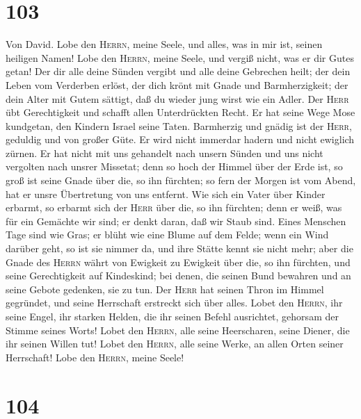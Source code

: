 \hypertarget{section-102}{%
\section{103}\label{section-102}}

 Von David. Lobe den \textsc{Herrn}, meine Seele, und
alles, was in mir ist, seinen heiligen Namen!  Lobe den
\textsc{Herrn}, meine Seele, und vergiß nicht, was er dir Gutes getan!
 Der dir alle deine Sünden vergibt und alle deine
Gebrechen heilt;  der dein Leben vom Verderben erlöst, der
dich krönt mit Gnade und Barmherzigkeit;  der dein Alter
mit Gutem sättigt, daß du wieder jung wirst wie ein Adler.
 Der \textsc{Herr} übt Gerechtigkeit und schafft allen
Unterdrückten Recht.  Er hat seine Wege Mose kundgetan,
den Kindern Israel seine Taten.  Barmherzig und gnädig ist
der \textsc{Herr}, geduldig und von großer Güte.  Er wird
nicht immerdar hadern und nicht ewiglich zürnen.  Er hat
nicht mit uns gehandelt nach unsern Sünden und uns nicht vergolten nach
unsrer Missetat;  denn so hoch der Himmel über der Erde
ist, so groß ist seine Gnade über die, so ihn fürchten; 
so fern der Morgen ist vom Abend, hat er unsre Übertretung von uns
entfernt.  Wie sich ein Vater über Kinder erbarmt, so
erbarmt sich der \textsc{Herr} über die, so ihn fürchten;
 denn er weiß, was für ein Gemächte wir sind; er denkt
daran, daß wir Staub sind.  Eines Menschen Tage sind wie
Gras; er blüht wie eine Blume auf dem Felde;  wenn ein
Wind darüber geht, so ist sie nimmer da, und ihre Stätte kennt sie nicht
mehr;  aber die Gnade des \textsc{Herrn} währt von
Ewigkeit zu Ewigkeit über die, so ihn fürchten, und seine Gerechtigkeit
auf Kindeskind;  bei denen, die seinen Bund bewahren und
an seine Gebote gedenken, sie zu tun.  Der \textsc{Herr}
hat seinen Thron im Himmel gegründet, und seine Herrschaft erstreckt
sich über alles.  Lobet den \textsc{Herrn}, ihr seine
Engel, ihr starken Helden, die ihr seinen Befehl ausrichtet, gehorsam
der Stimme seines Worts!  Lobet den \textsc{Herrn}, alle
seine Heerscharen, seine Diener, die ihr seinen Willen tut!
 Lobet den \textsc{Herrn}, alle seine Werke, an allen
Orten seiner Herrschaft! Lobe den \textsc{Herrn}, meine Seele!

\hypertarget{section-103}{%
\section{104}\label{section-103}}

